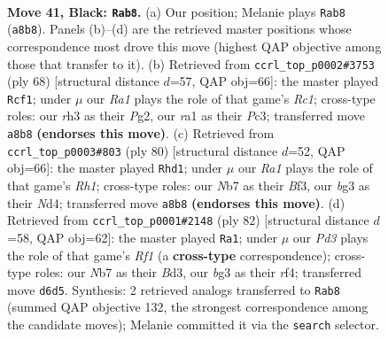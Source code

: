 \documentclass[11pt]{article}
\begin{document}
\clearpage

\begin{figure}[p]\centering
\begin{subfigure}{0.46\textwidth}\centering
\resizebox{\linewidth}{!}{%
\newchessgame
\chessboard[
  setfen={r1r5/1n3kbp/p2p2p1/P3p1P1/1pP1P2P/1P3PBR/2K3B1/R7 b - - 0 41},
  showmover=false,
  pgfstyle=straightmove, color=movearrow, markmove={a8-b8}
]}
\caption{}
\end{subfigure}\hfill
\begin{subfigure}{0.46\textwidth}\centering
\resizebox{\linewidth}{!}{%
\newchessgame
\chessboard[
  setfen={2r5/1p1brk1n/p1p3p1/P2p1p1p/1P1P1B2/2PB1P2/5KP1/2R4R w - - 1 35},
  showmover=false,
  pgfstyle=straightmove, color=movearrow, markmove={c1-f1}
]}
\caption{}
\end{subfigure}
\\[4pt]
\begin{subfigure}{0.46\textwidth}\centering
\resizebox{\linewidth}{!}{%
\newchessgame
\chessboard[
  setfen={4rk2/3b1p2/pb4pp/1prpP3/2pN1PPP/P3PB2/1P3K2/2R4R w - - 13 41},
  showmover=false,
  pgfstyle=straightmove, color=movearrow, markmove={h1-d1}
]}
\caption{}
\end{subfigure}\hfill
\begin{subfigure}{0.46\textwidth}\centering
\resizebox{\linewidth}{!}{%
\newchessgame
\chessboard[
  setfen={3r4/1p3pk1/pPpbp3/P5p1/3P1r1p/1KPB3P/4RPP1/5R2 w - - 22 42},
  showmover=false,
  pgfstyle=straightmove, color=movearrow, markmove={f1-a1}
]}
\caption{}
\end{subfigure}
\caption{\textbf{Move 41, Black: \texttt{Rab8}.} (a) Our position; Melanie plays \texttt{Rab8} (\texttt{a8b8}). Panels (b)--(d) are the retrieved master positions whose correspondence most drove this move (highest QAP objective among those that transfer to it). (b) Retrieved from \texttt{ccrl\_top\_p0002\#3753} (ply 68) [structural distance $d$=57, QAP obj=66]: the master played \texttt{Rcf1}; under $\mu$ our \emph{Ra1} plays the role of that game's \emph{Rc1}; cross-type roles: our \emph{r}h3 as their \emph{P}g2, our \emph{r}a1 as their \emph{P}c3; transferred move \texttt{a8b8} \textbf{(endorses this move)}. (c) Retrieved from \texttt{ccrl\_top\_p0003\#803} (ply 80) [structural distance $d$=52, QAP obj=66]: the master played \texttt{Rhd1}; under $\mu$ our \emph{Ra1} plays the role of that game's \emph{Rh1}; cross-type roles: our \emph{N}b7 as their \emph{B}f3, our \emph{b}g3 as their \emph{N}d4; transferred move \texttt{a8b8} \textbf{(endorses this move)}. (d) Retrieved from \texttt{ccrl\_top\_p0001\#2148} (ply 82) [structural distance $d$=58, QAP obj=62]: the master played \texttt{Ra1}; under $\mu$ our \emph{Pd3} plays the role of that game's \emph{Rf1} (a \textbf{cross-type} correspondence); cross-type roles: our \emph{N}b7 as their \emph{B}d3, our \emph{b}g3 as their \emph{r}f4; transferred move \texttt{d6d5}. Synthesis: 2 retrieved analogs transferred to \texttt{Rab8} (summed QAP objective 132, the strongest correspondence among the candidate moves); Melanie committed it via the \texttt{search} selector.}
\label{fig:thought-m81}
\end{figure}
\end{document}

